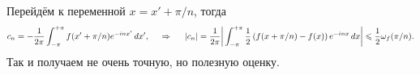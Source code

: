 \begin{uproof}
Перейдём к переменной $x = x' + \pi/n$, тогда
\begin{equation*}
    c_n = - \frac{1}{2\pi} \int_{-\pi}^{+\pi} f(x' + \pi/n) e^{-in x'} \, d x',
    \hspace{0.5cm} \Rightarrow \hspace{0.5cm}
    |c_n| = \frac{1}{2\pi} \bigg|
        \int_{-\pi}^{+\pi} \frac{1}{2} \left(f(x+\pi/n)-f(x)\right) e^{-inx} \, d x
    \bigg| \leqslant \frac{1}{2} \omega_f (\pi/n). 
\end{equation*}
Так и получаем не очень точную, но полезную оценку. 
\end{uproof}